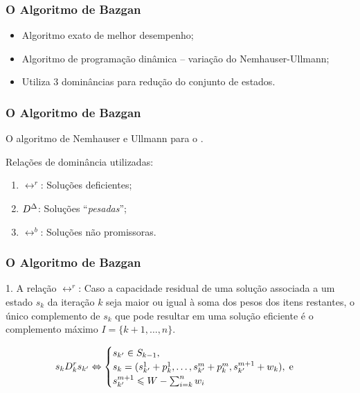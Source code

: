 \documentclass[10pt,xcolor=table,fleqn]{beamer}
\begin{document}
\begin{frame}
	\frametitle{O Algoritmo de Bazgan}
  \begin{itemize}
    \item{ Algoritmo exato de melhor desempenho; }
    \item{ Algoritmo de programação dinâmica -- variação do Nemhauser-Ullmann; }
    \item{ Utiliza 3 dominâncias para redução do conjunto de estados.}
  \end{itemize}
\end{frame}

\begin{frame}
	\frametitle{O Algoritmo de Bazgan}
  \begin{algorithm}[H]
    \footnotesize
    
    \caption{O algoritmo de Nemhauser e Ullmann para o \mokp.}
  \end{algorithm}
  \pause
  Relações de dominância utilizadas:
  \begin{enumerate}
    \item{ $\rel^r$: Soluções deficientes;}
    \item{ $D^{\Delta}$: Soluções ``\textit{pesadas}'';}
    \item{ $\rel^{b}$: Soluções não promissoras.}
  \end{enumerate}
\end{frame}

\begin{frame}
	\frametitle{O Algoritmo de Bazgan}
  \begin{block}{1. A relação $\rel^r$:}
    Caso a capacidade residual de uma solução associada a um estado $s_k$
    da iteração $k$ seja maior ou igual à soma dos pesos dos itens restantes,
    o único complemento de $s_k$ que pode resultar
    em uma solução eficiente é o complemento máximo $I = \{k+1, \ldots, n\}$.
  \end{block}
  \pause
  \begin{displaymath}
    s_k D_k^r s_{{k'}}
      \Leftrightarrow
      \begin{cases}
        s_{{k'}} \in S_{k-1}, \\
        s_k = (s_{{k'}}^1 + p_k^1, \ldots, s_{{k'}}^m + p_k^m, s_{{k'}}^{m+1} + w_k), \; \text{e} \\
        s_{{k'}}^{m+1} \leqslant W - \sum_{i=k}^n w_i
      \end{cases}
  \end{displaymath}
\end{frame}
\end{document}
